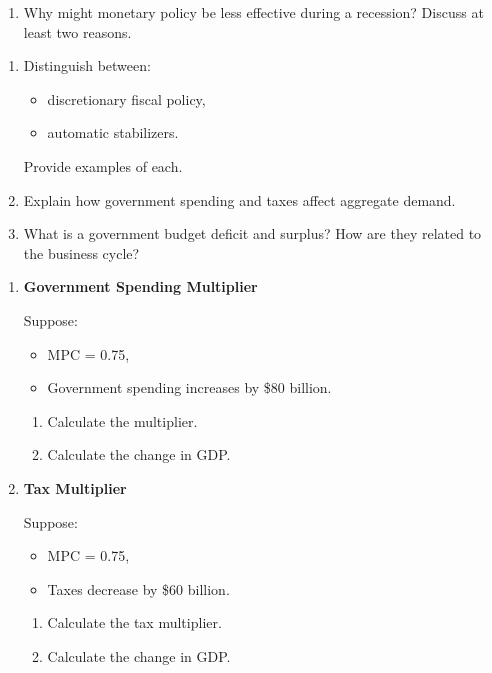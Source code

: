 \documentclass[12pt]{article}
\begin{document}
\begin{enumerate}[label=\textbf{\arabic*.}, start=12]

\item Why might monetary policy be less effective during a recession? 
Discuss at least two reasons.

\end{enumerate}


\vspace{1em}




\begin{enumerate}[label=\textbf{\arabic*.}, start=13]

\item Distinguish between:
\begin{itemize}
    \item discretionary fiscal policy,
    \item automatic stabilizers.
\end{itemize}
Provide examples of each.

\item Explain how government spending and taxes affect aggregate demand.

\item What is a government budget deficit and surplus? 
How are they related to the business cycle?

\end{enumerate}


\begin{enumerate}[label=\textbf{\arabic*.}, start=16]

\item \textbf{Government Spending Multiplier}

Suppose:
\begin{itemize}
    \item MPC = 0.75,
    \item Government spending increases by \$80 billion.
\end{itemize}

\begin{enumerate}
    \item[(a)] Calculate the multiplier.
    \item[(b)] Calculate the change in GDP.
\end{enumerate}

\item \textbf{Tax Multiplier}

Suppose:
\begin{itemize}
    \item MPC = 0.75,
    \item Taxes decrease by \$60 billion.
\end{itemize}

\begin{enumerate}
    \item[(a)] Calculate the tax multiplier.
    \item[(b)] Calculate the change in GDP.
\end{enumerate}

\end{enumerate}
\end{document}
